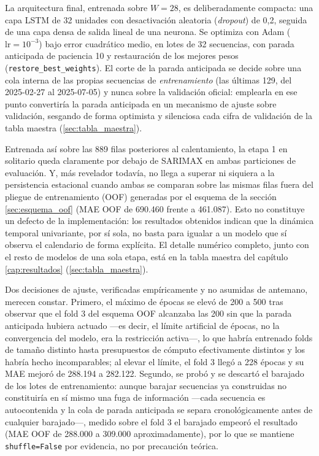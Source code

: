La arquitectura final, entrenada sobre $W=28$, es deliberadamente compacta: una capa
LSTM de 32 unidades con desactivación aleatoria (\emph{dropout}) de 0,2, seguida de una
capa densa de salida lineal de una neurona. Se optimiza con Adam ($\text{lr}=10^{-3}$)
bajo error cuadrático medio, en lotes de 32 secuencias, con parada anticipada de paciencia
10 y restauración de los mejores pesos (\texttt{restore\_best\_weights}). El corte de la
parada anticipada se decide sobre una cola interna de las propias secuencias de
\emph{entrenamiento} (las últimas 129, del 2025-02-27 al 2025-07-05) y nunca sobre la
validación oficial: emplearla en ese punto convertiría la parada anticipada en un
mecanismo de ajuste sobre validación, sesgando de forma optimista y silenciosa cada cifra
de validación de la tabla maestra (\ref{sec:tabla_maestra}).

Entrenada así sobre las 889 filas posteriores al calentamiento, la etapa 1 en solitario
queda claramente por debajo de SARIMAX en ambas particiones de evaluación. Y, más
revelador todavía, no llega a superar ni siquiera a la persistencia estacional cuando
ambas se comparan sobre las mismas filas fuera del pliegue de entrenamiento (OOF)
generadas por el esquema de la sección \ref{sec:esquema_oof} (MAE OOF de 690.460 frente a
461.087). Esto no constituye un defecto de la implementación: los resultados obtenidos indican
que la dinámica temporal univariante, por sí sola, no basta para igualar a un modelo que
sí observa el calendario de forma explícita. El detalle numérico completo, junto con el
resto de modelos de una sola etapa, está en la tabla maestra del capítulo
\ref{cap:resultados} (\ref{sec:tabla_maestra}).

Dos decisiones de ajuste, verificadas empíricamente y no asumidas de antemano, merecen
constar. Primero, el máximo de épocas se elevó de 200 a 500 tras observar que el fold 3
del esquema OOF alcanzaba las 200 sin que la parada anticipada hubiera actuado —es decir,
el límite artificial de épocas, no la convergencia del modelo, era la restricción
activa—, lo que habría entrenado folds de tamaño distinto hasta presupuestos de cómputo
efectivamente distintos y los habría hecho incomparables; al elevar el límite, el fold 3
llegó a 228 épocas y su MAE mejoró de 288.194 a 282.122. Segundo, se probó y se descartó
el barajado de los lotes de entrenamiento: aunque barajar secuencias ya construidas no
constituiría en sí mismo una fuga de información —cada secuencia es autocontenida y la
cola de parada anticipada se separa cronológicamente antes de cualquier barajado—, medido
sobre el fold 3 el barajado empeoró el resultado (MAE OOF de 288.000 a 309.000
aproximadamente), por lo que se mantiene \texttt{shuffle=False} por evidencia, no por
precaución teórica.

